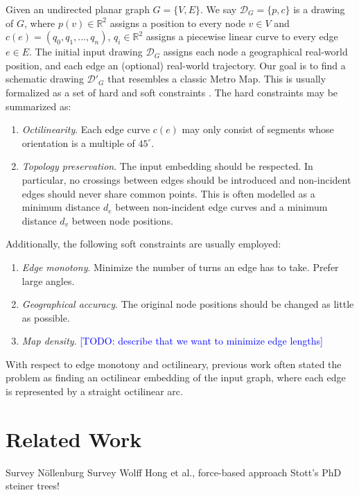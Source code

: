 \documentclass{sig-alternate-sigmod09}
\newcommand\TODO[1]{\textcolor{blue}{\small [TODO: #1]}}
\begin{document}
Given an undirected planar graph $G = \{V, E\}$. We say $\mathcal{D}_G = \{p, c\}$ is a drawing of $G$, where $p(v) \in \mathbb{R}^2$ assigns a position to every node $v \in V$ and $c(e) = (q_0, q_1, ..., q_n)$, $q_i \in \mathbb{R}^2$ assigns a piecewise linear curve to every edge $e \in E$. The initial input drawing $\mathcal{D}_G$ assigns each node a geographical real-world position, and each edge an (optional) real-world trajectory.
Our goal is to find a schematic drawing $\mathcal{D}'_G$ that resembles a classic Metro Map.
This is usually formalized as a set of hard and soft constraints \cite{nb, ...}.
The hard constraints may be summarized as:
\begin{enumerate}
\setlength\itemsep{.1em}
\item \emph{Octilinearity}. Each edge curve $c(e)$ may only consist of segments whose orientation is a multiple of $45^{\circ}$.
\item \emph{Topology preservation}. The input embedding should be respected. In particular, no crossings between edges should be introduced and non-incident edges should never share common points. This is often modelled as a minimum distance $d_{e}$ between non-incident edge curves and a minimum distance $d_{v}$ between node positions.
\end{enumerate}
Additionally, the following soft constraints are usually employed:
\begin{enumerate}
\setlength\itemsep{.1em}
\item \emph{Edge monotony}. Minimize the number of turns an edge has to take. Prefer large angles.
\item \emph{Geographical accuracy}. The original node positions should be changed as little as possible.
\item \emph{Map density}. \TODO{describe that we want to minimize edge lengths}
\end{enumerate}

With respect to edge monotony and octilineary, previous work often stated the problem as finding an octilinear embedding of the input graph, where each edge is represented by a straight octilinear arc.


\section{Related Work}

Survey Nöllenburg %
Survey Wolff %
Hong et al., force-based approach
Stott's PhD
steiner trees! %
\end{document}
